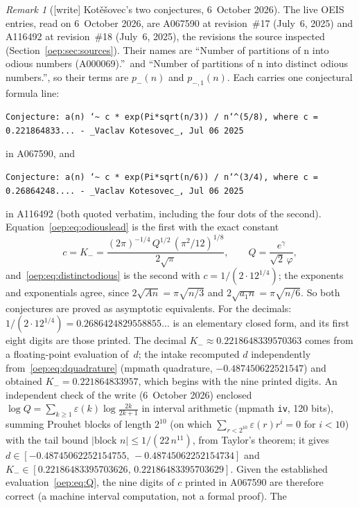 \documentclass[11pt,letterpaper]{article}
\theoremstyle{remark}\newtheorem{remark}[theorem]{Remark}
\newcommand{\eps}{\varepsilon}
\begin{document}
\begin{remark}[{[write]} Kot\v e\v sovec's two conjectures, 6~October 2026]\label{oep:rem:kotesovec}
The live OEIS entries, read on 6~October 2026, are A067590 at
revision~\#17 (July~6, 2025) and A116492 at revision~\#18 (July~6, 2025),
the revisions the source inspected (Section~\ref{oep:sec:sources}). Their
names are ``Number of partitions of n into odious numbers (A000069).''\ and
``Number of partitions of n into distinct odious numbers.'', so their terms
are $p_-(n)$ and $p_{-,1}(n)$. Each carries one conjectural formula line:
\begin{center}\small
\texttt{Conjecture: a(n) \char`\~{} c * exp(Pi*sqrt(n/3)) / n\char`\^{}(5/8), where c = 0.221864833... - \_Vaclav Kotesovec\_, Jul 06 2025}
\end{center}
in A067590, and
\begin{center}\small
\texttt{Conjecture: a(n) \char`\~{} c * exp(Pi*sqrt(n/6)) / n\char`\^{}(3/4), where c = 0.26864248.... - \_Vaclav Kotesovec\_, Jul 06 2025}
\end{center}
in A116492 (both quoted verbatim, including the four dots of the second).
Equation~\eqref{oep:eq:odiouslead} is the first with the exact constant
\[
 c=K_-=\frac{(2\pi)^{-1/4}\,Q^{1/2}\,(\pi^2/12)^{1/8}}{2\sqrt\pi},
 \qquad Q=\frac{e^\gamma}{\sqrt2\,\varphi},
\]
and~\eqref{oep:eq:distinctodious} is the second with
$c=1/(2\cdot12^{1/4})$; the exponents and exponentials agree, since
$2\sqrt{A n}=\pi\sqrt{n/3}$ and $2\sqrt{a_1n}=\pi\sqrt{n/6}$. So both
conjectures are proved as asymptotic equivalents. For the decimals:
$1/(2\cdot12^{1/4})=0.2686424829558855\ldots$ is an elementary closed form,
and its first eight digits are those printed. The decimal
$K_-\approx0.2218648339570363$ comes from a floating-point evaluation of~$d$;
the intake recomputed $d$ independently from~\eqref{oep:eq:dquadrature}
(mpmath quadrature, $-0.487450622521547$) and obtained
$K_-=0.221864833957$, which begins with the nine printed digits. An
independent check of the write (6~October 2026) enclosed
$\log Q=\sum_{k\ge1}\eps(k)\log\frac{2k}{2k+1}$ in interval arithmetic
(mpmath \texttt{iv}, 120 bits), summing Prouhet blocks of length $2^{10}$
(on which $\sum_{r<2^{10}}\eps(r)r^i=0$ for $i<10$) with the tail bound
$\lvert\text{block }n\rvert\le1/(22\,n^{11})$, from Taylor's theorem; it
gives $d\in[-0.48745062252154755,\,-0.48745062252154734]$ and
$K_-\in[0.22186483395703626,\,0.22186483395703629]$. Given the established
evaluation~\eqref{oep:eq:Q}, the nine digits of $c$ printed in A067590 are
therefore correct (a machine interval computation, not a formal proof). The

\end{remark}
\end{document}
